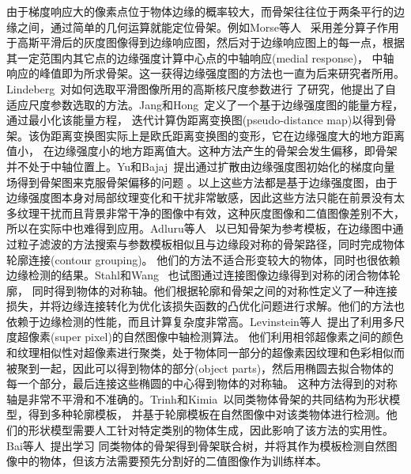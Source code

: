 \documentclass[UTF8]{ctexart}
\numberwithin{equation}{section} %
\numberwithin{table}{section} %
\begin{document}
由于梯度响应大的像素点位于物体边缘的概率较大，而骨架往往位于两条平行的边缘之间，通过简单的几何运算就能定位骨架。例如Morse等人~\cite{morse1994muitiscale}
采用差分算子作用于高斯平滑后的灰度图像得到边缘响应图，然后对于边缘响应图上的每一点，根据其一定范围内其它点的边缘强度计算中心点的中轴响应(medial response)，
中轴响应的峰值即为所求骨架。这一获得边缘强度图的方法也一直为后来研究者所用。Lindeberg~\cite{lindeberg1998edge}对如何选取平滑图像所用的高斯核尺度参数进行
了研究，他提出了自适应尺度参数选取的方法。Jang和Hong~\cite{jang2001pseudo}定义了一个基于边缘强度图的能量方程，通过最小化该能量方程，
迭代计算伪距离变换图(pseudo-distance map)以得到骨架。该伪距离变换图实际上是欧氏距离变换图的变形，它在边缘强度大的地方距离值小，
在边缘强度小的地方距离值大。这种方法产生的骨架会发生偏移，即骨架并不处于中轴位置上。Yu和Bajaj~\cite{yu2004segmentation}提出通过扩散由边缘强度图初始化的梯度向量场得到骨架图来克服骨架偏移的问题 。以上这些方法都是基于边缘强度图，由于边缘强度图本身对局部纹理变化和干扰非常敏感，因此这些方法只能在前景没有太多纹理干扰而且背景非常干净的图像中有效，这种灰度图像和二值图像差别不大，所以在实际中也难得到应用。Adluru等人~\cite{adluru2007contour}
以已知骨架为参考模板，在边缘图中通过粒子滤波的方法搜索与参数模板相似且与边缘段对称的骨架路径，同时完成物体轮廓连接(contour grouping)。
他们的方法不适合形变较大的物体，同时也很依赖边缘检测的结果。Stahl和Wang ~\cite{stahl2008globally}也试图通过连接图像边缘得到对称的闭合物体轮廓，
同时得到物体的对称轴。他们根据轮廓和骨架之间的对称性定义了一种连接损失，并将边缘连接转化为优化该损失函数的凸优化问题进行求解。他们的方法也依赖于边缘检测的性能，而且计算复杂度非常高。Levinstein等人~\cite{levinshtein2013multiscale}提出了利用多尺度超像素(super pixel)的自然图像中轴检测算法。
他们利用相邻超像素之间的颜色和纹理相似性对超像素进行聚类，处于物体同一部分的超像素因纹理和色彩相似而被聚到一起，因此可以得到物体的部分(object parts)，然后用椭圆去拟合物体的每一个部分，最后连接这些椭圆的中心得到物体的对称轴。
这种方法得到的对称轴是非常不平滑和不准确的。Trinh和Kimia~\cite{trinh2009category}以同类物体骨架的共同结构为形状模型，得到多种轮廓模板，
并基于轮廓模板在自然图像中对该类物体进行检测。他们的形状模型需要人工针对特定类别的物体生成，因此影响了该方法的实用性。Bai等人~\cite{bai2009active}提出学习
同类物体的骨架得到骨架联合树，并将其作为模板检测自然图像中的物体，但该方法需要预先分割好的二值图像作为训练样本。
\end{document}
